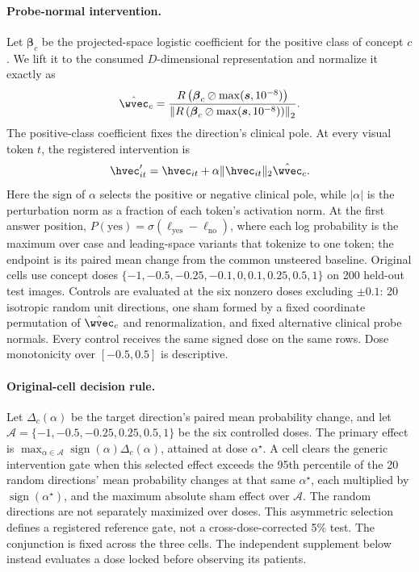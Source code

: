 \paragraph{Probe-normal intervention.}
Let $\boldsymbol\beta_c$ be the projected-space logistic coefficient for the positive class of concept $c$. We lift it to the consumed $D$-dimensional representation and normalize it exactly as
\begin{equation}
\hat\wvec_c = \frac{R\left(\boldsymbol\beta_c\oslash\max(\boldsymbol{s},10^{-8})\right)}{\left\lVert R\left(\boldsymbol\beta_c\oslash\max(\boldsymbol{s},10^{-8})\right)\right\rVert_2}.
\label{eq:lift}
\end{equation}
The positive-class coefficient fixes the direction's clinical pole. At every visual token $t$, the registered intervention is
\begin{equation}
\hvec'_{it}=\hvec_{it}+\alpha\lVert\hvec_{it}\rVert_2\hat\wvec_c.
\label{eq:intervention}
\end{equation}
Here the sign of $\alpha$ selects the positive or negative clinical pole, while $|\alpha|$ is the perturbation norm as a fraction of each token's activation norm. At the first answer position, $P(\mathrm{yes})=\sigma(\ell_{\mathrm{yes}}-\ell_{\mathrm{no}})$, where each log probability is the maximum over case and leading-space variants that tokenize to one token; the endpoint is its paired mean change from the common unsteered baseline. Original cells use concept doses $\{-1,-0.5,-0.25,-0.1,0,0.1,0.25,0.5,1\}$ on 200 held-out test images. Controls are evaluated at the six nonzero doses excluding $\pm0.1$: 20 isotropic random unit directions, one sham formed by a fixed coordinate permutation of $\hat\wvec_c$ and renormalization, and fixed alternative clinical probe normals. Every control receives the same signed dose on the same rows. Dose monotonicity over $[-0.5,0.5]$ is descriptive.

\paragraph{Original-cell decision rule.}
Let $\Delta_c(\alpha)$ be the target direction's paired mean probability change, and let $\mathcal A=\{-1,-0.5,-0.25,0.25,0.5,1\}$ be the six controlled doses. The primary effect is $\max_{\alpha\in\mathcal A}\operatorname{sign}(\alpha)\Delta_c(\alpha)$, attained at dose $\alpha^\star$. A cell clears the generic intervention gate when this selected effect exceeds the 95th percentile of the 20 random directions' mean probability changes at that same $\alpha^\star$, each multiplied by $\operatorname{sign}(\alpha^\star)$, and the maximum absolute sham effect over $\mathcal A$. The random directions are not separately maximized over doses. This asymmetric selection defines a registered reference gate, not a cross-dose-corrected 5\% test. The conjunction is fixed across the three cells. The independent supplement below instead evaluates a dose locked before observing its patients.

